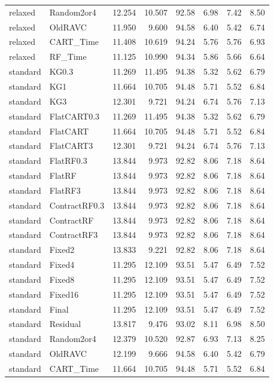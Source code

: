 \begin{longtable}{@{}llrrrrrr@{}}
relaxed & Random2or4 & 12.254 & 10.507 & 92.58 & 6.98 & 7.42 & 8.50\\
relaxed & OldRAVC & 11.950 & 9.600 & 94.58 & 6.40 & 5.42 & 6.74\\
relaxed & CART\_Time & 11.408 & 10.619 & 94.24 & 5.76 & 5.76 & 6.93\\
relaxed & RF\_Time & 11.125 & 10.990 & 94.34 & 5.86 & 5.66 & 6.64\\
standard & KG0.3 & 11.269 & 11.495 & 94.38 & 5.32 & 5.62 & 6.79\\
standard & KG1 & 11.664 & 10.705 & 94.48 & 5.71 & 5.52 & 6.84\\
standard & KG3 & 12.301 & 9.721 & 94.24 & 6.74 & 5.76 & 7.13\\
standard & FlatCART0.3 & 11.269 & 11.495 & 94.38 & 5.32 & 5.62 & 6.79\\
standard & FlatCART & 11.664 & 10.705 & 94.48 & 5.71 & 5.52 & 6.84\\
standard & FlatCART3 & 12.301 & 9.721 & 94.24 & 6.74 & 5.76 & 7.13\\
standard & FlatRF0.3 & 13.844 & 9.973 & 92.82 & 8.06 & 7.18 & 8.64\\
standard & FlatRF & 13.844 & 9.973 & 92.82 & 8.06 & 7.18 & 8.64\\
standard & FlatRF3 & 13.844 & 9.973 & 92.82 & 8.06 & 7.18 & 8.64\\
standard & ContractRF0.3 & 13.844 & 9.973 & 92.82 & 8.06 & 7.18 & 8.64\\
standard & ContractRF & 13.844 & 9.973 & 92.82 & 8.06 & 7.18 & 8.64\\
standard & ContractRF3 & 13.844 & 9.973 & 92.82 & 8.06 & 7.18 & 8.64\\
standard & Fixed2 & 13.833 & 9.221 & 92.82 & 8.06 & 7.18 & 8.64\\
standard & Fixed4 & 11.295 & 12.109 & 93.51 & 5.47 & 6.49 & 7.52\\
standard & Fixed8 & 11.295 & 12.109 & 93.51 & 5.47 & 6.49 & 7.52\\
standard & Fixed16 & 11.295 & 12.109 & 93.51 & 5.47 & 6.49 & 7.52\\
standard & Final & 11.295 & 12.109 & 93.51 & 5.47 & 6.49 & 7.52\\
standard & Residual & 13.817 & 9.476 & 93.02 & 8.11 & 6.98 & 8.50\\
standard & Random2or4 & 12.379 & 10.520 & 92.87 & 6.93 & 7.13 & 8.25\\
standard & OldRAVC & 12.199 & 9.666 & 94.58 & 6.40 & 5.42 & 6.79\\
standard & CART\_Time & 11.664 & 10.705 & 94.48 & 5.71 & 5.52 & 6.84\\

\end{longtable}

